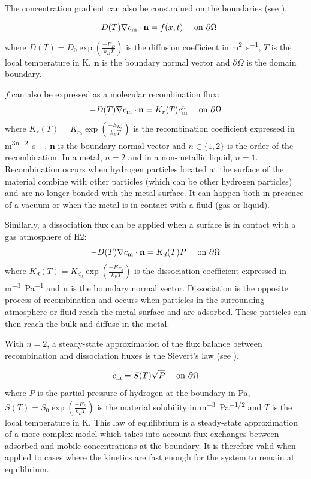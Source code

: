 The concentration gradient can also be constrained on the boundaries (see ).

\begin{equation}
    - D(T)\nabla c_\mathrm{m} \cdot \mathbf{n} = f(x, t) \quad \text { on } \partial \Omega
    \labeq{neuman robin bc}
\end{equation}
where $D(T) = D_0 \exp(\frac{-E_D}{k_B T}) $ is the diffusion coefficient in \si{m^2.s^{-1}}, $T$ is the local temperature in \si{K}, $\mathbf{n}$ is the boundary normal vector and $\partial \Omega$ is the domain boundary.

$f$ can also be expressed as a molecular recombination flux:
\begin{equation}
    - D(T)\nabla c_\mathrm{m} \cdot \mathbf{n} = K_r(T) c_\mathrm{m}^n \quad \text { on } \partial \Omega
    \labeq{recombination flux}
\end{equation}
where $K_r(T) = K_{r_0} \exp(\frac{-E_{K_r}}{k_B T}) $ is the recombination coefficient expressed in \si{m^{3n-2}.s^{-1}}, $\mathbf{n}$ is the boundary normal vector and $n \in \{1, 2\}$ is the order of the recombination.
In a metal, $n=2$ and in a non-metallic liquid, $n=1$.
Recombination occurs when hydrogen particles located at the surface of the material combine with other particles (which can be other hydrogen particles) and are no longer bonded with the metal surface.
It can happen both in presence of a vacuum or when the metal is in contact with a fluid (gas or liquid).

Similarly, a dissociation flux can be applied when a surface is in contact with a gas atmosphere of H2:
\begin{equation}
    - D(T)\nabla c_\mathrm{m} \cdot \mathbf{n} = K_d(T) P \quad \text { on } \partial \Omega
    \labeq{dissociation flux}
\end{equation}
where $K_d(T) = K_{d_0} \exp(\frac{-E_{K_d}}{k_B T}) $ is the dissociation coefficient expressed in \si{m^{-3}.Pa^{-1}} and $\mathbf{n}$ is the boundary normal vector.
Dissociation is the opposite process of recombination and occurs when particles in the surrounding atmosphere or fluid reach the metal surface and are adsorbed.
These particles can then reach the bulk and diffuse in the metal.

With $n=2$, a steady-state approximation of the flux balance between recombination and dissociation fluxes is the Sievert's law (see ).

\begin{equation}
    c_\mathrm{m} = S(T) \sqrt{P}\quad \text { on } \partial \Omega
    \labeq{Sievert's law}
\end{equation}
where $P$ is the partial pressure of hydrogen at the boundary in \si{Pa}, $S(T)=S_0 \exp(\frac{-E_S}{k_B T})$ is the material solubility in \si{m^{-3}.Pa^{-1/2}} and $T$ is the local temperature in \si{K}.
This law of equilibrium is a steady-state approximation of a more complex model which takes into account flux exchanges between adsorbed and mobile concentrations at the boundary.
It is therefore valid when applied to cases where the kinetics are fast enough for the system to remain at equilibrium.

